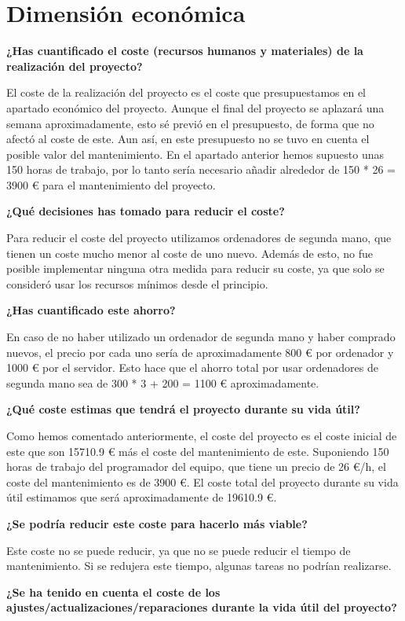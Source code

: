 \section{Dimensión económica}

\textbf{¿Has cuantificado el coste (recursos humanos y materiales) de la realización del proyecto?}

El coste de la realización del proyecto es el coste que presupuestamos en el apartado económico del proyecto. Aunque el final del proyecto se aplazará una semana aproximadamente, esto sé previó en el presupuesto, de forma que no afectó al coste de este. Aun así, en este presupuesto no se tuvo en cuenta el posible valor del mantenimiento. En el apartado anterior hemos supuesto unas 150 horas de trabajo, por lo tanto sería necesario añadir alrededor de 150 * 26 = 3900 € para el mantenimiento del proyecto.

\textbf{¿Qué decisiones has tomado para reducir el coste?}

Para reducir el coste del proyecto utilizamos ordenadores de segunda mano, que tienen un coste mucho menor al coste de uno nuevo. Además de esto, no fue posible implementar ninguna otra medida para reducir su coste, ya que solo se consideró usar los recursos mínimos desde el principio.

\textbf{¿Has cuantificado este ahorro?}

En caso de no haber utilizado un ordenador de segunda mano y haber comprado nuevos, el precio por cada uno sería de aproximadamente 800 € por ordenador y 1000 € por el servidor. Esto hace que el ahorro total por usar ordenadores de segunda mano sea de 300 * 3 + 200 = 1100 € aproximadamente.

\textbf{¿Qué coste estimas que tendrá el proyecto durante su vida útil?}

Como hemos comentado anteriormente, el coste del proyecto es el coste inicial de este que son 15710.9 € más el coste del mantenimiento de este. Suponiendo 150 horas de trabajo del programador del equipo, que tiene un precio de 26 €/h, el coste del mantenimiento es de 3900 €. El coste total del proyecto durante su vida útil estimamos que será aproximadamente de 19610.9 €.

\textbf{¿Se podría reducir este coste para hacerlo más viable?}

Este coste no se puede reducir, ya que no se puede reducir el tiempo de mantenimiento. Si se redujera este tiempo, algunas tareas no podrían realizarse.

\textbf{¿Se ha tenido en cuenta el coste de los ajustes/actualizaciones/reparaciones durante la vida útil del proyecto?}

